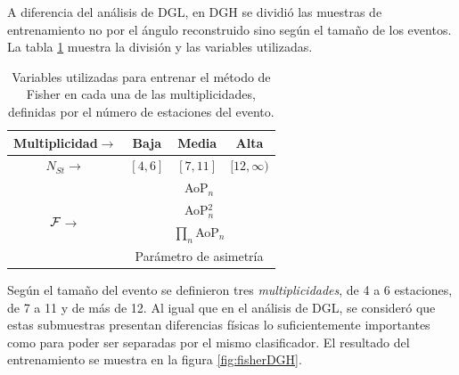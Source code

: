 	A diferencia del análisis de DGL, en DGH se dividió las muestras de entrenamiento no por el ángulo reconstruido sino según el tamaño de los eventos.
	La tabla \ref{tab:fisherDGH} muestra la división y las variables utilizadas.
	\begin{table}[h!]
		\begin{center}
		\renewcommand{\arraystretch}{1.4}
		\footnotesize
			\begin{tabular}{|c|c|c|c|}
			\hline
			Multiplicidad\hfill$\rightarrow$& Baja & Media & Alta \\
			\hline
			$N_{St}$\hfill$\rightarrow$ & $[4,6]$ & $[7,11]$ & $[12,\infty)$ \\
			\hline
			\multirow{4}{*}{$\cal{F}$\hspace*{25mm}$\rightarrow$}  & \multicolumn{3}{c|}{AoP$_n$} \\
			                 & \multicolumn{3}{c|}{AoP$^2_n$} \\
			                 & \multicolumn{3}{c|}{$\prod_n$AoP$_n$} \\
			                 & \multicolumn{3}{c|}{Parámetro de asimetría} \\
			\hline
			\end{tabular}
			\caption{\label{tab:fisherDGH}
			Variables utilizadas para entrenar el método de Fisher en cada una de las multiplicidades, definidas por el número de estaciones del evento.}
		\end{center}	 
	\end{table}
	Según el tamaño del evento se definieron tres \emph{multiplicidades}, de 4 a 6 estaciones, de 7 a 11 y de más de 12.
	Al igual que en el análisis de DGL, se consideró que estas submuestras presentan diferencias físicas lo suficientemente importantes como para poder ser separadas por el mismo clasificador.
	El resultado del entrenamiento se muestra en la figura \ref{fig:fisherDGH}.
